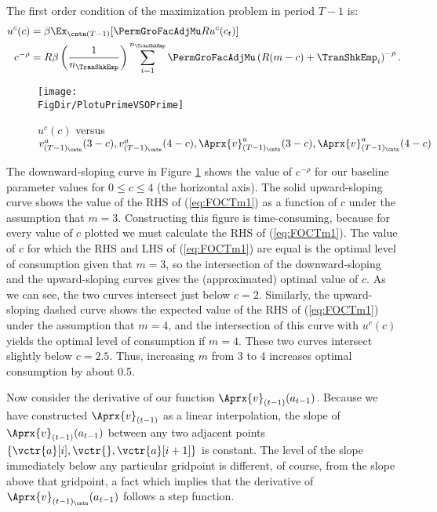 The first order condition of the maximization problem in period $T-1$ is:
  \begin{equation}\begin{gathered}\begin{aligned}
        u^{c}(c)       & = \beta \Ex_{\cntn(T-1)} [\PermGroFacAdjMu R u^{c}(c_{t})]  %
        \\      c^{-\rho}   & = R \beta \left(\frac{1}{n_{\TranShkEmp}}\right) \sum_{i=1}^{n_{\TranShkEmp}} \PermGroFacAdjMu\left(R (m-c) + \TranShkEmp_{i}\right)^{-\rho} \label{eq:FOCTm1}.
      \end{aligned}\end{gathered}\end{equation}
\hypertarget{PlotuPrimeVSOPrime}{}
\begin{figure}
  \centerline{\texttt{[image: \\FigDir/PlotuPrimeVSOPrime]}}
  \caption{$u^{c}(c)$ versus $v_{({T-1})_\cntn}^{a}(3-c), v_{({T-1})_\cntn}^{a}(4-c), \Aprx{v}_{({T-1})_\cntn}^{a}(3-c), \Aprx{v}_{({T-1})_\cntn}^{a}(4-c)$}
  \label{fig:PlotuPrimeVSOPrime}
\end{figure}



The downward-sloping curve in Figure \ref{fig:PlotuPrimeVSOPrime}
shows the value of $c^{-\rho}$ for our baseline parameter values
for $0 \leq c \leq 4$ (the horizontal axis).  The solid
upward-sloping curve shows the value of the RHS of (\ref{eq:FOCTm1})
as a function of $c$ under the assumption that $m=3$.
Constructing this figure is time-consuming, because for every
value of $c$ plotted we must calculate the RHS of
(\ref{eq:FOCTm1}).  The value of $c$ for which the RHS and LHS
of (\ref{eq:FOCTm1}) are equal is the optimal level of consumption
given that $m=3$, so the intersection of the downward-sloping
and the upward-sloping curves gives the (approximated) optimal value of $c$.
As we can see, the two curves intersect just below $c=2$.
Similarly, the upward-sloping dashed curve shows the expected value
of the RHS of (\ref{eq:FOCTm1}) under the assumption that $m=4$,
and the intersection of this curve with $u^{c}(c)$ yields the
optimal level of consumption if $m=4$.  These two curves
intersect slightly below $c=2.5$.  Thus, increasing $m$
from 3 to 4 increases optimal consumption by about 0.5.

Now consider the derivative of our function $\Aprx{v}_{(t-1)}(a_{t-1})$.  Because we have
constructed $\Aprx{v}_{(t-1)}$ as a linear interpolation, the slope of
$\Aprx{v}_{(t-1)}(a_{t-1})$ between any two adjacent points
$\{\vctr{a}[i],\vctr{},\vctr{a}[{i+1}]\}$ is constant.  The level of the slope immediately below any
particular gridpoint is different, of course, from the slope above that gridpoint, a fact which
implies that the derivative of $\Aprx{v}_{(t-1)_\cntn}(a_{t-1})$ follows a step function.

